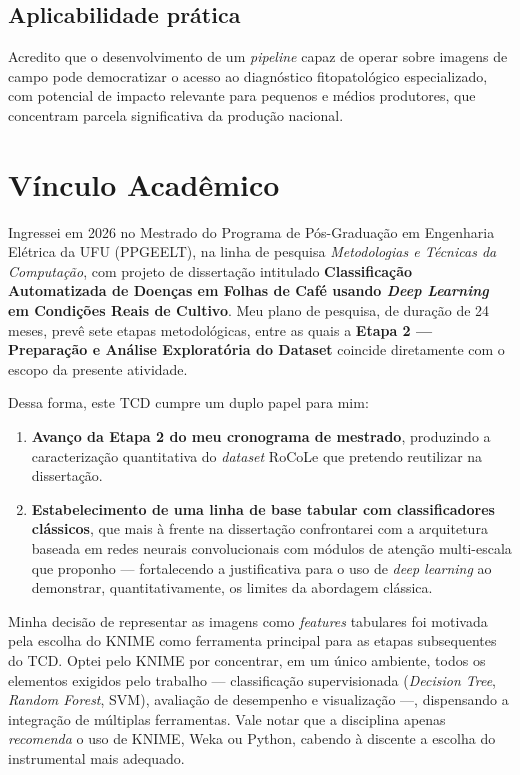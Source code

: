 \documentclass[11pt,a4paper]{article}
\begin{document}
\subsection*{Aplicabilidade prática}

Acredito que o desenvolvimento de um \textit{pipeline} capaz de operar sobre imagens de campo pode democratizar o acesso ao diagnóstico fitopatológico especializado, com potencial de impacto relevante para pequenos e médios produtores, que concentram parcela significativa da produção nacional.

\section{Vínculo Acadêmico}

Ingressei em 2026 no Mestrado do Programa de Pós-Graduação em Engenharia Elétrica da UFU (PPGEELT), na linha de pesquisa \textit{Metodologias e Técnicas da Computação}, com projeto de dissertação intitulado \textbf{\guillemotleft{}Classificação Automatizada de Doenças em Folhas de Café usando \textit{Deep Learning} em Condições Reais de Cultivo\guillemotright{}}. Meu plano de pesquisa, de duração de 24 meses, prevê sete etapas metodológicas, entre as quais a \textbf{Etapa 2 --- Preparação e Análise Exploratória do Dataset} coincide diretamente com o escopo da presente atividade.

Dessa forma, este TCD cumpre um duplo papel para mim:
\begin{enumerate}
  \item \textbf{Avanço da Etapa 2 do meu cronograma de mestrado}, produzindo a caracterização quantitativa do \textit{dataset} RoCoLe que pretendo reutilizar na dissertação.
  \item \textbf{Estabelecimento de uma linha de base tabular com classificadores clássicos}, que mais à frente na dissertação confrontarei com a arquitetura baseada em redes neurais convolucionais com módulos de atenção multi-escala que proponho --- fortalecendo a justificativa para o uso de \textit{deep learning} ao demonstrar, quantitativamente, os limites da abordagem clássica.
\end{enumerate}

Minha decisão de representar as imagens como \textit{features} tabulares foi motivada pela escolha do KNIME como ferramenta principal para as etapas subsequentes do TCD. Optei pelo KNIME por concentrar, em um único ambiente, todos os elementos exigidos pelo trabalho --- classificação supervisionada (\textit{Decision Tree}, \textit{Random Forest}, SVM), avaliação de desempenho e visualização ---, dispensando a integração de múltiplas ferramentas. Vale notar que a disciplina apenas \textit{recomenda} o uso de KNIME, Weka ou Python, cabendo à discente a escolha do instrumental mais adequado.
\end{document}
